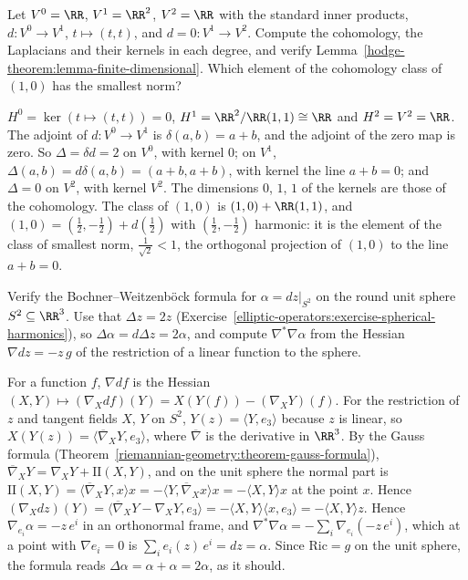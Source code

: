 \begin{exercise}\label{hodge-theorem:exercise-finite-dimensional}
Let $V^0 = \RR$, $V^1 = \RR^2$, $V^2 = \RR$ with the standard inner products, $d \colon V^0 \to V^1$, $t \mapsto (t, t)$, and $d = 0 \colon V^1 \to V^2$. Compute the cohomology, the
Laplacians and their kernels in each degree, and verify Lemma~\ref{hodge-theorem:lemma-finite-dimensional}. Which element of the cohomology class of $(1, 0)$ has the smallest norm?
\end{exercise}

\begin{solution}
$H^0 = \ker(t \mapsto (t, t)) = 0$, $H^1 = \RR^2/\RR(1, 1) \cong \RR$ and $H^2 = V^2 = \RR$. The adjoint of $d \colon V^0 \to V^1$ is $\delta(a, b) = a + b$, and the
adjoint of the zero map is zero. So $\Delta = \delta d = 2$ on $V^0$, with kernel $0$; on $V^1$, $\Delta(a, b) = d\delta(a, b) = (a + b, a + b)$, with kernel the line $a + b = 0$; and $\Delta = 0$ on $V^2$, with kernel
$V^2$. The dimensions $0$, $1$, $1$ of the kernels are those of the cohomology. The class of $(1, 0)$ is $(1, 0) + \RR(1, 1)$, and $(1, 0) = (\frac12, -\frac12) + d(\frac12)$ with $(\frac12, -\frac12)$ harmonic: it
is the element of the class of smallest norm, $\frac{1}{\sqrt2} < 1$, the orthogonal projection of $(1, 0)$ to the line $a + b = 0$.
\end{solution}

\begin{exercise}\label{hodge-theorem:exercise-weitzenbock-sphere}
Verify the Bochner--Weitzenb\"ock formula for $\alpha = dz|_{S^2}$ on the round unit sphere $S^2 \subseteq \RR^3$. Use that $\Delta z = 2z$ (Exercise~\ref{elliptic-operators:exercise-spherical-harmonics}), so
$\Delta\alpha = d\Delta z = 2\alpha$, and compute $\nabla^*\nabla\alpha$ from the Hessian $\nabla dz = -z\,g$ of the restriction of a linear function to the sphere.
\end{exercise}

\begin{solution}
For a function $f$, $\nabla df$ is the Hessian $(X, Y) \mapsto (\nabla_Xdf)(Y) = X(Y(f)) - (\nabla_XY)(f)$. For the restriction of $z$ and tangent fields $X$, $Y$ on $S^2$, $Y(z) = \langle Y, e_3\rangle$
because $z$ is linear, so $X(Y(z)) = \langle\overline\nabla_XY, e_3\rangle$, where $\overline\nabla$ is the derivative in $\RR^3$. By the Gauss formula (Theorem~\ref{riemannian-geometry:theorem-gauss-formula}),
$\overline\nabla_XY = \nabla_XY + \mathrm{II}(X, Y)$, and on the unit sphere the normal part is $\mathrm{II}(X, Y) = \langle\overline\nabla_XY, x\rangle x = -\langle Y, \overline\nabla_Xx\rangle x = -\langle X, Y\rangle x$ at the point $x$.
Hence $(\nabla_Xdz)(Y) = \langle\overline\nabla_XY - \nabla_XY, e_3\rangle = -\langle X, Y\rangle\langle x, e_3\rangle = -\langle X, Y\rangle z$. Hence $\nabla_{e_i}\alpha = -z\,e^i$ in an orthonormal frame, and
$\nabla^*\nabla\alpha = -\sum_i\nabla_{e_i}(-z\,e^i)$, which at a point with $\nabla e_i = 0$ is $\sum_ie_i(z)\,e^i = dz = \alpha$. Since $\mathrm{Ric} = g$ on the unit sphere, the formula reads
$\Delta\alpha = \alpha + \alpha = 2\alpha$, as it should.
\end{solution}

